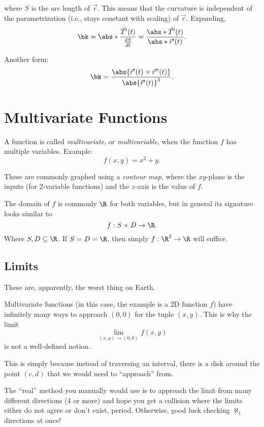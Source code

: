 \documentclass{article}
\begin{document}
where $S$ is the arc length of $\vec{r}$. This means that the curvature is
independent of the parametrization (i.e., stays constant with scaling) of $\vec{r}$. Expanding,
\begin{equation*}
  \bk = \abs*{\frac{\vec{T}'(t)}{\frac{dS}{dt}}} = \frac{\abs*{\vec{T}'(t)}}{\abs*{\vec{r}'(t)}}.
\end{equation*}

Another form:
\begin{equation}
  \bk = \frac{\abs{\vec{r}'(t) \times \vec{r}''(t)}}{\abs{\vec{r}'(t)}^{3}}.
\end{equation}

\section{Multivariate Functions}
A function is called \textit{multivariate}, or \textit{multivariable}, when the function $f$ has multiple variables.
Example:
\begin{displaymath}
  f(x, y) = x^{2} + y.
\end{displaymath}

These are commonly graphed using a \textit{contour map}, where the $xy$-plane is the inputs (for 2-variable functions)
and the $z$-axis is the value of $f$.

The domain of $f$ is commonly $\R$ for both variables, but in general its signature looks similar to
\begin{equation}
  f: S \times D \to \R.
\end{equation}
Where $S, D \subseteq \R$. If $S = D = \R$, then simply $f: \R^{2} \to \R$ will suffice.

\subsection{Limits}
These are, apparently, the worst thing on Earth.

Multivariate functions (in this case, the example is a 2D function $f$) have infinitely many
ways to approach $(0, 0)$ for the tuple $(x, y)$. This is why the limit
\begin{equation*}
  \lim_{(x, y) \to (0, 0)} f(x, y)
\end{equation*}
is not a well-defined notion.

This is simply because instead of traversing an interval, there is a disk around the point $(c, d)$ that we would need to ``approach'' from.

The ``real'' method you manually would use is to approach the limit from many different directions (4 or more) and hope you get a collision
where the limits either do not agree or don't exist, period. Otherwise, good luck checking $\aleph_{1}$ directions at once!
\end{document}

